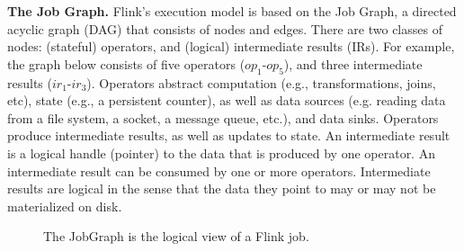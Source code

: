 \documentclass{sig-alternate}
\begin{document}
\textbf{The Job Graph.} Flink's execution model is based on the Job Graph, a directed acyclic graph (DAG) that consists of nodes and edges. There are two classes of nodes: (stateful) operators, and (logical) intermediate results (IRs). For example, the graph below consists of five operators ($op_1$-$op_5$), and three intermediate results ($ir_1$-$ir_3$). Operators abstract computation (e.g., transformations, joins, etc), state (e.g., a persistent counter), as well as data sources (e.g. reading data from a file system, a socket, a message queue, etc.), and data sinks. Operators produce intermediate results, as well as updates to state. An intermediate result is a logical handle (pointer) to the data that is produced by one operator. An intermediate result can be consumed by one or more operators. Intermediate results are logical in the sense that the data they point to may or may not be materialized on disk.

\begin{figure}[ht]
\centering
{}
\label{fig:JobGraph}
\caption{The JobGraph is the logical view of a Flink job.}
\end{figure}
\end{document}
